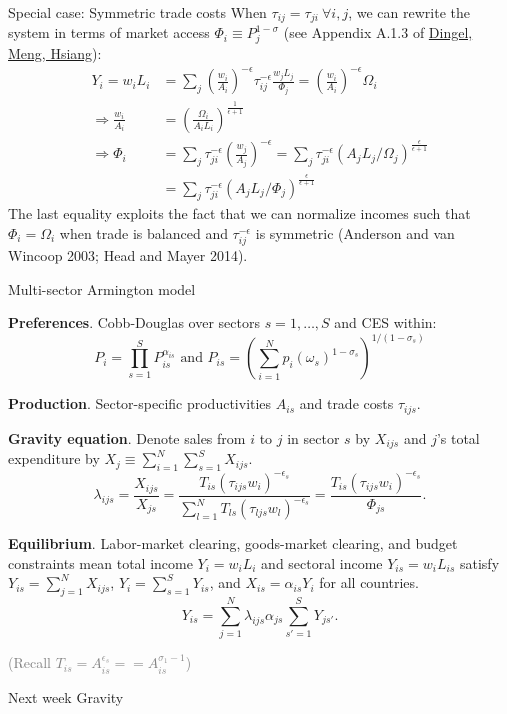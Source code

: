 \documentclass[10pt,notes=hide]{beamer}
\begin{document}
\begin{frame}{Special case: Symmetric trade costs}
When $\tau_{ij} = \tau_{ji} \ \forall i,j$,
we can rewrite the system in terms of market access $\Phi_i \equiv P_j^{1-\sigma}$
(see Appendix A.1.3 of \href{http://www.jdingel.com/research/DingelMengHsiang.pdf}{Dingel, Meng, Hsiang}):
\begin{align*}
Y_i = w_i L_i  	&= \sum_j \left(\frac{w_i}{A_i}\right)^{-\epsilon}\tau_{ij}^{-\epsilon} \frac{w_j L_j}{\Phi_j}
			= \left(\frac{w_i}{A_i}\right)^{-\epsilon} \Omega_i \\
\Rightarrow \frac{w_i}{A_i}	&= \left(\frac{\Omega_i}{A_i L_i}\right)^{\frac{1}{\epsilon+1}} \\
\Rightarrow \Phi_i 	&= \sum_j \tau_{ji}^{-\epsilon} \left(\frac{w_j}{A_j}\right)^{-\epsilon} 
					= \sum_j \tau_{ji}^{-\epsilon} \left(A_j L_j / \Omega_j\right)^{\frac{\epsilon}{\epsilon+1}}\\
					&= \sum_j \tau_{ji}^{-\epsilon} \left(A_j L_j / \Phi_j\right)^{\frac{\epsilon}{\epsilon+1}}
\end{align*}
The last equality exploits the fact that 
we can normalize incomes such that $\Phi_i = \Omega_i$
when trade is balanced and $\tau_{ij}^{-\epsilon}$ is symmetric
(Anderson and van Wincoop 2003; Head and Mayer 2014).
\end{frame}
\begin{frame}{Multi-sector Armington model}
\begin{itemize}{\small
\item \textbf{Preferences}.
Cobb-Douglas over sectors $s = 1, \dots, S$ and CES within:
\begin{equation*}
P_i = \prod_{s=1}^S P_{is}^{\alpha_{is}} \text{ and } P_{is} = \left(\sum_{i=1}^{N} p_i(\omega_s)^{1-\sigma_s} \right)^{1/(1-\sigma_s)}
\end{equation*}
\item \textbf{Production}.
Sector-specific productivities $A_{is}$ and trade costs $\tau_{ijs}$.
\item \textbf{Gravity equation}.
Denote sales from $i$ to $j$ in sector $s$ by $X_{ijs}$ 
and $j$'s total expenditure by $X_j \equiv \sum_{i=1}^{N} \sum_{s=1}^{S} X_{ijs}$.
\begin{equation*}
\lambda_{ijs} = \frac{X_{ijs}}{X_{js}}
= \frac{T_{is} \left(\tau_{ijs}w_i\right)^{-\epsilon_s}}{\sum_{l=1}^{N} T_{ls}  \left(\tau_{ljs}w_l\right)^{-\epsilon_s}}
=\frac{T_{is} \left(\tau_{ijs}w_i\right)^{-\epsilon_s}}{\Phi_{js}}.
\end{equation*}
\item \textbf{Equilibrium}.
Labor-market clearing, goods-market clearing, and budget constraints mean
total income $Y_i = w_i L_i$ and sectoral income $Y_{is} = w_i L_{is}$ satisfy
$Y_{is} = \sum_{j=1}^{N} X_{ijs}$, $Y_i = \sum_{s=1}^{S} Y_{is}$, and $X_{is} = \alpha_{is} Y_i$ for all countries.
\begin{equation*}
	Y_{is} = \sum_{j=1}^{N} \lambda_{ijs} \alpha_{js} \sum_{s'=1}^{S} Y_{js'} .
\end{equation*}
}\end{itemize}
\textcolor{gray}{(Recall $T_{is} = A_{is}^{\epsilon_s} = = A_{is}^{\sigma_1 - 1}$)}
\end{frame}
\begin{frame}{Next week}
Gravity
\end{frame}
\end{document}
